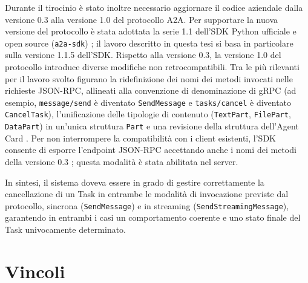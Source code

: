 Durante il tirocinio è stato inoltre necessario aggiornare il codice aziendale dalla versione 0.3 alla versione 1.0 del protocollo A2A. Per supportare la nuova versione del protocollo è stata adottata la serie 1.1 dell'SDK Python ufficiale e open source (\texttt{a2a-sdk}) \cite{a2apythonchangelog}; il lavoro descritto in questa tesi si basa in particolare sulla versione 1.1.5 dell'SDK. Rispetto alla versione 0.3, la versione 1.0 del protocollo introduce diverse modifiche non retrocompatibili. Tra le più rilevanti per il lavoro svolto figurano la ridefinizione dei nomi dei metodi invocati nelle richieste JSON-RPC, allineati alla convenzione di denominazione di gRPC (ad esempio, \texttt{message/send} è diventato \texttt{SendMessage} e \texttt{tasks/cancel} è diventato \texttt{CancelTask}), l'unificazione delle tipologie di contenuto (\texttt{TextPart}, \texttt{FilePart}, \texttt{DataPart}) in un'unica struttura \texttt{Part} e una revisione della struttura dell'Agent Card \cite{a2awhatsnew}. Per non interrompere la compatibilità con i client esistenti, l'SDK consente di esporre l'endpoint JSON-RPC accettando anche i nomi dei metodi della versione 0.3 \cite{a2apythonsdk}; questa modalità è stata abilitata nel server.

In sintesi, il sistema doveva essere in grado di gestire correttamente la cancellazione di un Task in entrambe le modalità di invocazione previste dal protocollo, sincrona (\texttt{SendMessage}) e in streaming (\texttt{SendStreamingMessage}), garantendo in entrambi i casi un comportamento coerente e uno stato finale del Task univocamente determinato.

\section{Vincoli}
\label{sec:vincoli}


